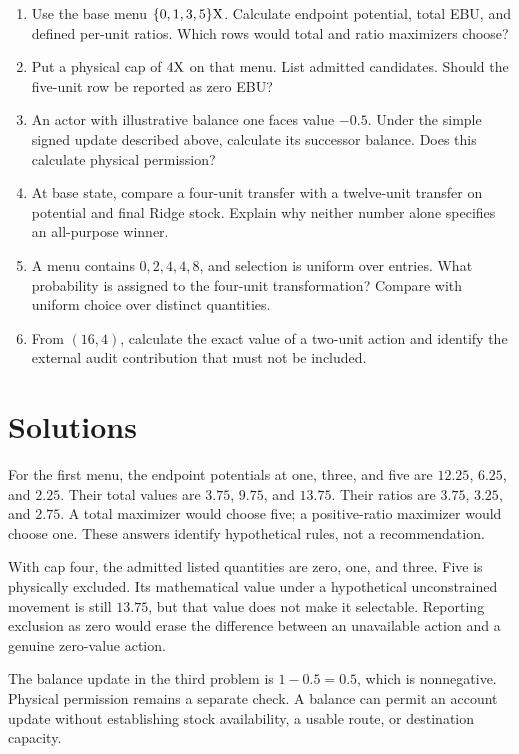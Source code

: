 \begin{enumerate}
\item Use the base menu \(\{0,1,3,5\}\mathrm{X}\). Calculate endpoint potential, total EBU, and defined per-unit ratios. Which rows would total and ratio maximizers choose?
\item Put a physical cap of \(4\mathrm{X}\) on that menu. List admitted candidates. Should the five-unit row be reported as zero EBU?
\item An actor with illustrative balance one faces value \(-0.5\). Under the simple signed update described above, calculate its successor balance. Does this calculate physical permission?
\item At base state, compare a four-unit transfer with a twelve-unit transfer on potential and final Ridge stock. Explain why neither number alone specifies an all-purpose winner.
\item A menu contains \(0,2,4,4,8\), and selection is uniform over entries. What probability is assigned to the four-unit transformation? Compare with uniform choice over distinct quantities.
\item From \((16,4)\), calculate the exact value of a two-unit action and identify the external audit contribution that must not be included.
\end{enumerate}

\section{Solutions}

For the first menu, the endpoint potentials at one, three, and five are \(12.25\), \(6.25\), and \(2.25\). Their total values are \(3.75\), \(9.75\), and \(13.75\). Their ratios are \(3.75\), \(3.25\), and \(2.75\). A total maximizer would choose five; a positive-ratio maximizer would choose one. These answers identify hypothetical rules, not a recommendation.

With cap four, the admitted listed quantities are zero, one, and three. Five is physically excluded. Its mathematical value under a hypothetical unconstrained movement is still \(13.75\), but that value does not make it selectable. Reporting exclusion as zero would erase the difference between an unavailable action and a genuine zero-value action.

The balance update in the third problem is \(1-0.5=0.5\), which is nonnegative. Physical permission remains a separate check. A balance can permit an account update without establishing stock availability, a usable route, or destination capacity.

